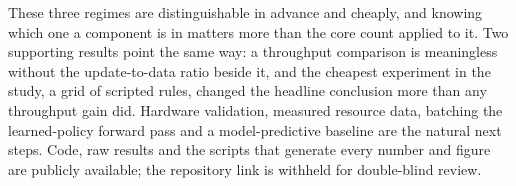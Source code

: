 \documentclass[conference]{IEEEtran}
\begin{document}
These three regimes are distinguishable in advance and cheaply, and knowing which one a component is in matters
more than the core count applied to it. Two supporting results point the same way: a throughput comparison is
meaningless without the update-to-data ratio beside it, and the cheapest experiment in the study, a grid of
scripted rules, changed the headline conclusion more than any throughput gain did. Hardware validation, measured
resource data, batching the learned-policy forward pass and a model-predictive baseline are the natural next steps.
Code, raw results and the scripts that generate every number and figure are publicly available; the repository link
is withheld for double-blind review.

\footnotesize


\end{document}
